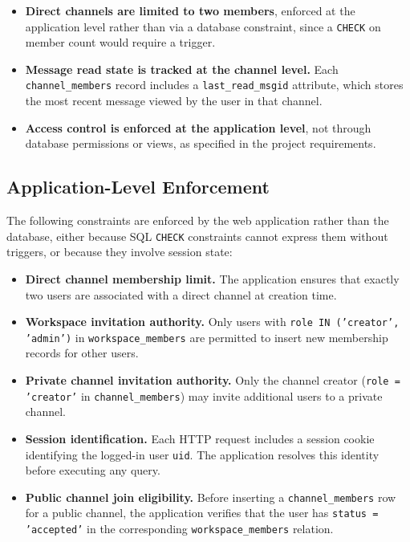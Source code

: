 \documentclass[11pt]{article}
\begin{document}
\begin{itemize}
\item \textbf{Direct channels are limited to two members}, enforced at the application level rather than via a database constraint, since a \texttt{CHECK} on member count would require a trigger.
\item \textbf{Message read state is tracked at the channel level.} Each \texttt{channel\_members} record includes a \texttt{last\_read\_msgid} attribute, which stores the most recent message viewed by the user in that channel.
\item \textbf{Access control is enforced at the application level}, not through database permissions or views, as specified in the project requirements.
\end{itemize}

\subsection{Application-Level Enforcement}

The following constraints are enforced by the web application rather than the database, either because SQL \texttt{CHECK} constraints cannot express them without triggers, or because they involve session state:

\begin{itemize}
\item \textbf{Direct channel membership limit.} The application ensures that exactly two users are associated with a direct channel at creation time.
\item \textbf{Workspace invitation authority.} Only users with \texttt{role IN ('creator', 'admin')} in \texttt{workspace\_members} are permitted to insert new membership records for other users.
\item \textbf{Private channel invitation authority.} Only the channel creator (\texttt{role = 'creator'} in \texttt{channel\_members}) may invite additional users to a private channel.
\item \textbf{Session identification.} Each HTTP request includes a session cookie identifying the logged-in user \texttt{uid}. The application resolves this identity before executing any query.
\item \textbf{Public channel join eligibility.} Before inserting a \texttt{channel\_members} row for a public channel, the application verifies that the user has \texttt{status = 'accepted'} in the corresponding \texttt{workspace\_members} relation.
\end{itemize}
\end{document}
